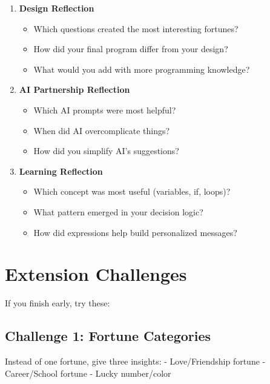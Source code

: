 \documentclass[
  letterpaper,
  DIV=11,
  numbers=noendperiod,
  oneside]{scrreprt}
\providecommand{\tightlist}{%
  \setlength{\itemsep}{0pt}\setlength{\parskip}{0pt}}\usepackage{longtable,booktabs,array}
\begin{document}
\begin{enumerate}
\def\labelenumi{\arabic{enumi}.}
\tightlist
\item
  \textbf{Design Reflection}

  \begin{itemize}
  \tightlist
  \item
    Which questions created the most interesting fortunes?
  \item
    How did your final program differ from your design?
  \item
    What would you add with more programming knowledge?
  \end{itemize}
\item
  \textbf{AI Partnership Reflection}

  \begin{itemize}
  \tightlist
  \item
    Which AI prompts were most helpful?
  \item
    When did AI overcomplicate things?
  \item
    How did you simplify AI's suggestions?
  \end{itemize}
\item
  \textbf{Learning Reflection}

  \begin{itemize}
  \tightlist
  \item
    Which concept was most useful (variables, if, loops)?
  \item
    What pattern emerged in your decision logic?
  \item
    How did expressions help build personalized messages?
  \end{itemize}
\end{enumerate}

\section{Extension Challenges}\label{extension-challenges}

If you finish early, try these:

\subsection{Challenge 1: Fortune
Categories}\label{challenge-1-fortune-categories}

Instead of one fortune, give three insights: - Love/Friendship fortune -
Career/School fortune - Lucky number/color
\end{document}
